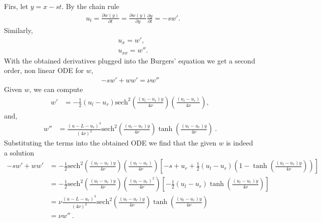 
\begin{questions}


\begin{solution}

Firs, let $y = x-st$. By the chain rule
\begin{align*}
& u_t = \frac{\partial w(y)}{\partial t} =\frac{\partial w(y)}{\partial y}\frac{\partial y}{\partial t} = -sw'.
\end{align*}
Similarly,
\begin{align*}
& u_x = w',\\
& u_{xx} = w''.
\end{align*}
With the obtained derivatives plugged into the Burgers' equation we get a second order, non linear ODE for $w$,
\begin{align*}
-sw'+ww' = \nu w''
\end{align*}
Given $w$, we can compute
\begin{align*}
w' & = -\frac{1}{2}(u_l-u_r)\text{sech}^2\left(\frac{(u_l-u_r)y}{4\nu}\right)\left(\frac{(u_l-u_r)}{4\nu} \right),
\end{align*}
and,
\begin{align*}
w'' & = \frac{(u-L-u_r)^3}{(4\nu)^2}\text{sech}^2\left(\frac{(u_l-u_r)y}{4\nu}\right)\tanh\left(\frac{(u_l-u_r)y}{4\nu}\right) ~.
\end{align*}
Substituting the terms into the obtained ODE we find that the given $w$ is indeed a solution
\begin{align*}
-sw'+ww' &= -\frac{1}{2}\text{sech}^2\left(\frac{(u_l-u_r)y}{4\nu}\right)\left(\frac{(u_l-u_r)}{4\nu} \right)\left[-s+u_r+\frac{1}{2}(u_l-u_r)\left(1-\tanh\left(\frac{(u_l-u_r)y}{4\nu}\right)\right)\right] \\
& = -\frac{1}{2}\text{sech}^2\left(\frac{(u_l-u_r)y}{4\nu}\right)\left(\frac{(u_l-u_r)^2}{4\nu} \right)\left[-\frac{1}{2}(u_l-u_r)\tanh\left(\frac{(u_l-u_r)y}{4\nu}\right)\right] \\
& = \nu\frac{(u-L-u_r)^3}{(4\nu)^2}\text{sech}^2\left(\frac{(u_l-u_r)y}{4\nu}\right)\tanh\left(\frac{(u_l-u_r)y}{4\nu}\right) \\
& = \nu w''~.
\end{align*}

\end{solution}

\end{questions}
